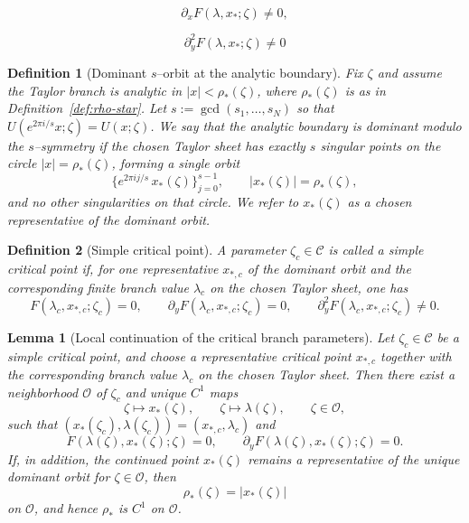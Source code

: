 \documentclass[10pt,a4paper]{amsart}
\newtheorem{definition}{Definition}
\newtheorem{lemma}{Lemma}
\begin{document}
	\begin{equation}
		\partial_xF(\lambda,x_*;\zeta)\neq0,
	\end{equation}

	\begin{equation}
		\partial_y^2F(\lambda,x_*;\zeta)\neq0
	\end{equation}

\begin{definition}[Dominant $s$--orbit at the analytic boundary]\label{def:dominant-orbit}
	Fix $\zeta$ and assume the Taylor branch is analytic in $|x|<\rho_*(\zeta)$, where $\rho_*(\zeta)$ is
	as in Definition~\ref{def:rho-star}. Let $s:=\gcd(s_1,\dots,s_N)$ so that
	$U(e^{2\pi i/s}x;\zeta)=U(x;\zeta)$. We say that the analytic boundary is \emph{dominant modulo the $s$--symmetry} if the chosen Taylor sheet has
	exactly $s$ singular points on the circle $|x|=\rho_*(\zeta)$, forming a single orbit
	\[
		\bigl\{e^{2\pi i j/s}\,x_*(\zeta)\bigr\}_{j=0}^{s-1},
		\qquad |x_*(\zeta)|=\rho_*(\zeta),
	\]
	and no other singularities on that circle. We refer to $x_*(\zeta)$ as a chosen representative of the
	dominant orbit.
\end{definition}

\begin{definition}[Simple critical point]\label{def:simple-critical}
	A parameter $\zeta_c\in\mathcal C$ is called a \emph{simple critical point}
	if, for one representative $x_{*,c}$ of the dominant
	orbit and the corresponding finite branch value $\lambda_c$ on the chosen Taylor
	sheet, one has
	\[
		F(\lambda_c,x_{*,c};\zeta_c)=0,
		\qquad
		\partial_yF(\lambda_c,x_{*,c};\zeta_c)=0,
		\qquad
		\partial_y^2F(\lambda_c,x_{*,c};\zeta_c)\neq0.
	\]
\end{definition}

\begin{lemma}[Local continuation of the critical branch parameters]
\label{lem:local-branch-data}
Let \(\zeta_c\in\mathcal C\) be a simple critical point, and choose a
representative critical point \(x_{*,c}\) together with the corresponding
branch value \(\lambda_c\) on the chosen Taylor sheet. Then there exist a
neighborhood \(\mathcal O\) of \(\zeta_c\) and unique \(C^1\) maps
\[
\zeta\mapsto x_*(\zeta),\qquad
\zeta\mapsto \lambda(\zeta),\qquad
\zeta\in\mathcal O,
\]
such that \((x_*(\zeta_c),\lambda(\zeta_c))=(x_{*,c},\lambda_c)\) and
\[
F(\lambda(\zeta),x_*(\zeta);\zeta)=0,
\qquad
\partial_yF(\lambda(\zeta),x_*(\zeta);\zeta)=0.
\]
If, in addition, the continued point \(x_*(\zeta)\) remains a representative
of the unique dominant orbit for \(\zeta\in\mathcal O\), then
\[
\rho_*(\zeta)=|x_*(\zeta)|
\]
on \(\mathcal O\), and hence \(\rho_*\) is \(C^1\) on \(\mathcal O\).
\end{lemma}
\end{document}
